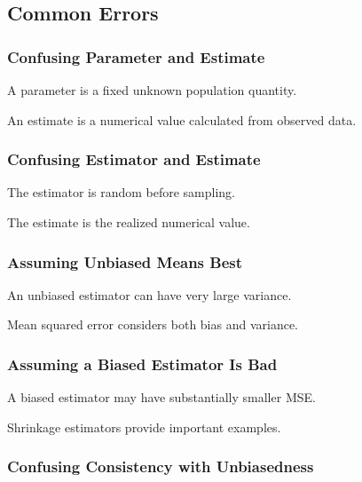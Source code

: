 \subsection{Common Errors}
\label{subsec:statistical-estimation-common-errors}

\subsubsection{Confusing Parameter and Estimate}

A parameter is a fixed unknown population quantity.

An estimate is a numerical value calculated from observed data.

\subsubsection{Confusing Estimator and Estimate}

The estimator is random before sampling.

The estimate is the realized numerical value.

\subsubsection{Assuming Unbiased Means Best}

An unbiased estimator can have very large variance.

Mean squared error considers both bias and variance.

\subsubsection{Assuming a Biased Estimator Is Bad}

A biased estimator may have substantially smaller MSE.

Shrinkage estimators provide important examples.

\subsubsection{Confusing Consistency with Unbiasedness}

